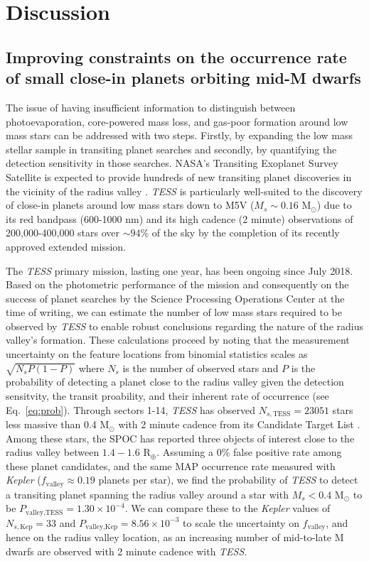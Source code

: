 \documentclass[twocolumn]{emulateapj}
\newcommand{\kepler}[1]{\emph{Kepler}#1}
\newcommand{\tess}[1]{\emph{TESS}#1}
\begin{document}
\section{Discussion} \label{sect:discussion}
\subsection{Improving constraints on the occurrence rate of small close-in planets orbiting mid-M dwarfs}
The issue of having insufficient information to distinguish between photoevaporation, core-powered mass loss, and gas-poor
formation around low mass stars can be addressed with two steps. Firstly, by expanding the low mass stellar sample in 
transiting planet searches and secondly, by quantifying the detection sensitivity in those searches. 
NASA's Transiting Exoplanet Survey Satellite \citep[\tess{;}][]{ricker15} is expected to provide hundreds of new transiting
planet discoveries in the vicinity of the radius valley \citep{barclay18}. \tess{} is particularly well-suited to the discovery of
close-in planets around low mass stars down to M5V ($M_s\sim 0.16$ M$_{\odot}$) due to its red bandpass (600-1000 nm)
and its high cadence (2 minute) observations of 200,000-400,000 stars over $\sim 94$\% of the sky by the completion of its
recently approved extended mission.

The \tess{} primary mission, lasting one year, has been ongoing since July 2018. 
Based on the photometric performance of the mission and consequently on the success of planet searches by the
Science Processing Operations Center \citep[SPOC;][]{jenkins16,twicken18,li18} at the time of writing,
we can estimate the number of low mass stars required to be observed
by \tess{} to enable robust conclusions regarding the nature of the radius valley's formation. These calculations
proceed by noting that the measurement uncertainty on the feature locations from binomial statistics scales as
$\sqrt{N_sP(1-P)}$ where $N_s$ is the number of observed stars and $P$ is the probability of detecting a planet close to
the radius valley 
given the detection sensitvity, the transit proability, and their inherent rate of occurrence (see Eq.~\ref{eq:prob}).
Through sectors 1-14, \tess{} has observed $N_{s,\text{TESS}} = 23051$ stars less massive than 0.4 M$_{\odot}$
with 2 minute cadence from its Candidate Target List \citep[CTL;][]{stassun19}.
Among these stars, the SPOC has reported three objects of interest close to the radius valley
between $1.4-1.6$ R$_{\oplus}$. Assuming a 0\% false positive rate
among these planet candidates, and the same MAP occurrence rate measured with \kepler{}
($f_{\text{valley}}\approx 0.19$ planets per star), we find the probability of \tess{} to detect a transiting planet
spanning the radius valley around a star with $M_s<0.4$ M$_{\odot}$ to be 
$P_{\text{valley,TESS}}=1.30 \times 10^{-4}$. We can compare these to the \kepler{} values of $N_{s,\text{Kep}}=33$ and
$P_{\text{valley,Kep}}=8.56\times 10^{-3}$ to scale the uncertainty on $f_{\text{valley}}$, and hence on the radius
valley location, as an increasing number of mid-to-late M dwarfs are observed with 2 minute cadence with \tess{.}
\end{document}
